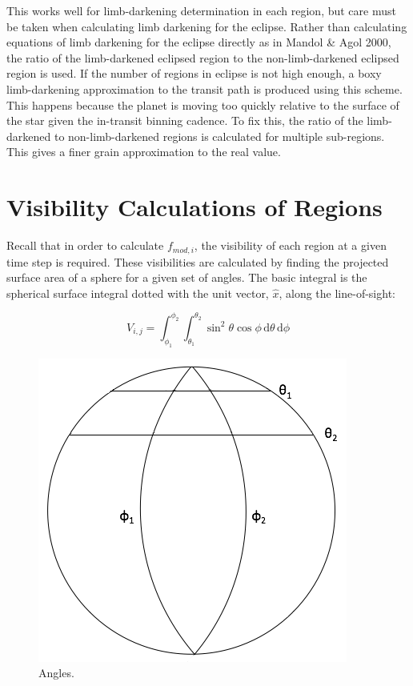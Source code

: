 \documentclass[iop]{emulateapj}
\newcommand{\fmod}{\mbox{$f_{mod,i}$}}
\begin{document}
This works well for limb-darkening determination in each region, but care must be taken when calculating limb darkening for the eclipse. Rather than calculating equations of limb darkening for the eclipse directly as in Mandol \& Agol 2000, the ratio of the limb-darkened eclipsed region to the non-limb-darkened eclipsed region is used. If the number of regions in eclipse is not high enough, a boxy limb-darkening approximation to the transit path is produced using this scheme. This happens because the planet is moving too quickly relative to the surface of the star given the in-transit binning cadence. To fix this, the ratio of the limb-darkened to non-limb-darkened regions is calculated for multiple sub-regions. This gives a finer grain approximation to the real value.

\section{Visibility Calculations of Regions \label{vis}}
Recall that in order to calculate \fmod, the visibility of each region at a given time step is required. These visibilities are calculated by finding the projected surface area of a sphere for a given set of angles. The basic integral is the spherical surface integral dotted with the unit vector, $\hat{x}$, along the line-of-sight:

\begin{equation}
	V_{i,j} = \int_{\phi_1}^{\phi_2} \int_{\theta_1}^{\theta_2} \sin^2{\theta}\cos{\phi}\,\mathrm{d}\theta \, \mathrm{d}\phi
\end{equation}

\begin{figure}[h]
	\centering
	\includegraphics[width=.5\textwidth]{images/angles.png}
	\caption{Angles.}
	\label{angles}
\end{figure}
\end{document}
